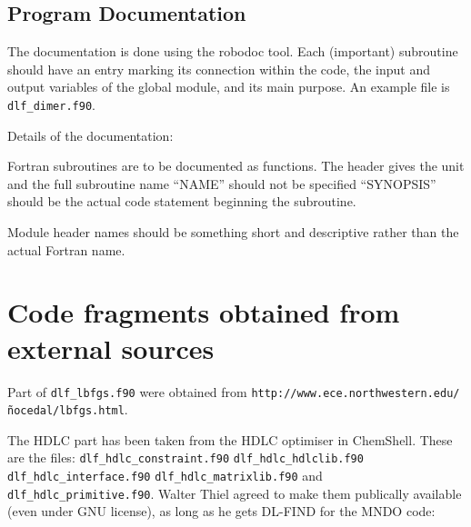 \documentclass{article}
\begin{document}
\subsection{Program Documentation}

The documentation is done using the robodoc tool. Each (important) subroutine
should have an entry marking its connection within the code, the input and
output variables of the global module, and its main purpose. An example file is
\texttt{dlf\_dimer.f90}.

Details of the documentation:

Fortran subroutines are to be documented as functions. The header gives the
unit and the full subroutine name ``NAME'' should not be specified
``SYNOPSIS'' should be the actual code statement beginning the subroutine.

Module header names should be something short and descriptive rather than the
actual Fortran name.

\section{Code fragments obtained from external sources}

Part of \texttt{dlf\_lbfgs.f90} were obtained from
\texttt{http://www.ece.northwestern.edu/\~nocedal/lbfgs.html}.

The HDLC part has been taken from the HDLC optimiser in ChemShell. These are
the files: \texttt{dlf\_hdlc\_constraint.f90} \texttt{dlf\_hdlc\_hdlclib.f90}
\texttt{dlf\_hdlc\_interface.f90} \texttt{dlf\_hdlc\_matrixlib.f90} and
\texttt{dlf\_hdlc\_primitive.f90}. Walter Thiel agreed to make them publically
available (even under GNU license), as long as he gets DL-FIND for the MNDO
code:
\end{document}
